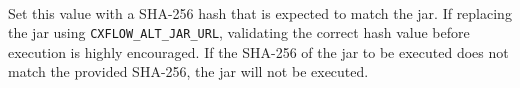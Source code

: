 
\noindent\\Set this value with a SHA-256 hash that is expected to match the \cxflow jar.  
If replacing the \cxflow jar using \texttt{CXFLOW\_ALT\_JAR\_URL},
validating the correct hash value before execution is highly encouraged.  
If the SHA-256 of the \cxflow jar to be executed does not match
the provided SHA-256, the jar will not be executed.
